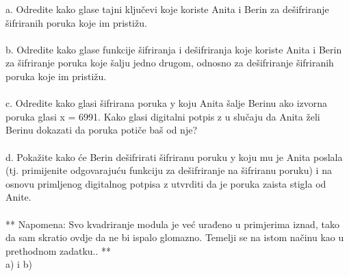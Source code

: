 \documentclass[12pt]{article}
\begin{document}
\begin{enumerate}
a. Odredite kako glase tajni ključevi koje koriste Anita i Berin za dešifriranje šifriranih
poruka koje im pristižu. \\
\\
b. Odredite kako glase funkcije šifriranja i dešifriranja koje koriste Anita i Berin za
šifriranje poruka koje šalju jedno drugom, odnosno za dešifriranje šifriranih poruka
koje im pristižu. \\
\\
c. Odredite kako glasi šifrirana poruka y koju Anita šalje Berinu ako izvorna poruka
glasi x = 6991. Kako glasi digitalni potpis z u slučaju da Anita želi Berinu dokazati da
poruka potiče baš od nje? \\
\\
d. Pokažite kako će Berin dešifrirati šifriranu poruku y koju mu je Anita poslala (tj.
primijenite odgovarajuću funkciju za dešifriranje na šifriranu poruku) i na osnovu
primljenog digitalnog potpisa z utvrditi da je poruka zaista stigla od Anite. \\
\\
** Napomena: Svo kvadriranje modula je već urađeno u primjerima iznad, tako da
sam skratio ovdje da ne bi ispalo glomazno. Temelji se na istom načinu kao u prethodnom 
zadatku.. ** \\ 
a) i b) \\


\end{enumerate}
\end{document}
